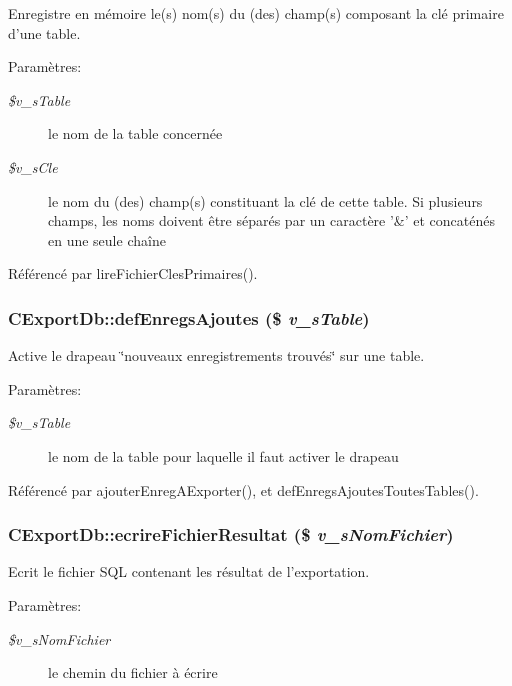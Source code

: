 Enregistre en mémoire le(s) nom(s) du (des) champ(s) composant la clé primaire d'une table. 

\begin{Desc}
\item[Paramètres:]
\begin{description}
\item[{\em \$v\_\-sTable}]le nom de la table concernée \item[{\em \$v\_\-sCle}]le nom du (des) champ(s) constituant la clé de cette table. Si plusieurs champs, les noms doivent être séparés par un caractère '\&' et concaténés en une seule chaîne \end{description}
\end{Desc}


Référencé par lireFichierClesPrimaires().
\subsubsection{\setlength{\rightskip}{0pt plus 5cm}CExportDb::defEnregsAjoutes (\$ {\em v\_\-sTable})}\label{class_c_export_db_031476f3dfa21dcfb45461141bdb84a4}


Active le drapeau \char`\"{}nouveaux enregistrements trouvés\char`\"{} sur une table. 

\begin{Desc}
\item[Paramètres:]
\begin{description}
\item[{\em \$v\_\-sTable}]le nom de la table pour laquelle il faut activer le drapeau \end{description}
\end{Desc}


Référencé par ajouterEnregAExporter(), et defEnregsAjoutesToutesTables().
\subsubsection{\setlength{\rightskip}{0pt plus 5cm}CExportDb::ecrireFichierResultat (\$ {\em v\_\-sNomFichier})}\label{class_c_export_db_f49b7a7713d79172695685d79cd7d0dd}


Ecrit le fichier SQL contenant les résultat de l'exportation. 

\begin{Desc}
\item[Paramètres:]
\begin{description}
\item[{\em \$v\_\-sNomFichier}]le chemin du fichier à écrire \end{description}
\end{Desc}



